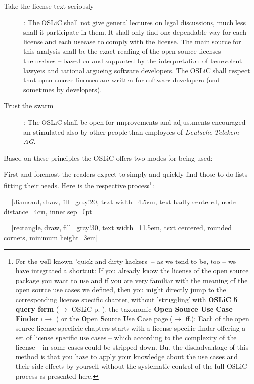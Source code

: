 \begin{description}
  \item[Take the license text seriously]: The OSLiC shall not give general
  lectures on legal discussions, much less shall it participate in them. It
  shall only find one dependable way for each license and each usecase to comply
  with the license. The main source for this analysis shall be the exact reading
  of the open source licenses themselves -- based on and supported by the
  interpretation of benevolent lawyers and rational argueing software
  developers. The OSLiC shall respect that open source licenses are written for
  software developers (and sometimes by developers).
  
  \item[Trust the swarm]: The OSLiC shall be open for improvements and
  adjustments encouraged an stimulated also by other people than employees of
  \emph{Deutsche Telekom AG}.
\end{description}

Based on these principles the OSLiC offers two modes for being used:

First and foremost the readers expect to simply and quickly find those to-do
lists fitting their needs. Here is the respective process\footnote{For the well
known 'quick and dirty hackers' -- as we tend to be, too -- we have integrated a
shortcut: If you already know the license of the open source package you want to
use and if you are very familiar with the meaning of the open source use cases
we defined, then you might directly jump to the corresponding license specific
chapter, without 'struggling' with \textbf{OSLiC 5 query form} ($\rightarrow$
OSLiC p. \pageref{OSLiCStandardFormForGatheringInformation}), the taxonomic
\textbf{Open Source Use Case Finder} ($\rightarrow$
\pageref{OSLiCUseCaseFinder}) or the \textbf{O}pen \textbf{S}ource \textbf{U}se
\textbf{C}ase page ($\rightarrow$ \pageref{OSUCList}ff.): Each of the open
source license specficic chapters starts with a license specific finder offering
a set of license specific use cases -- which according to the complexity of the
license -- in some cases could be stripped down. But the disdadvantage of this
method is that you have to apply your knowledge about the use cases and their
side effects by yourself without the systematic control of the full OSLiC
process as presented here.}:

 = [diamond, draw, fill=gray!20, 
    text width=4.5em, text badly centered, node distance=4cm, inner sep=0pt]

 = [rectangle, draw, fill=gray!30, 
    text width=11.5em, text centered, rounded corners, minimum height=3em]
 
